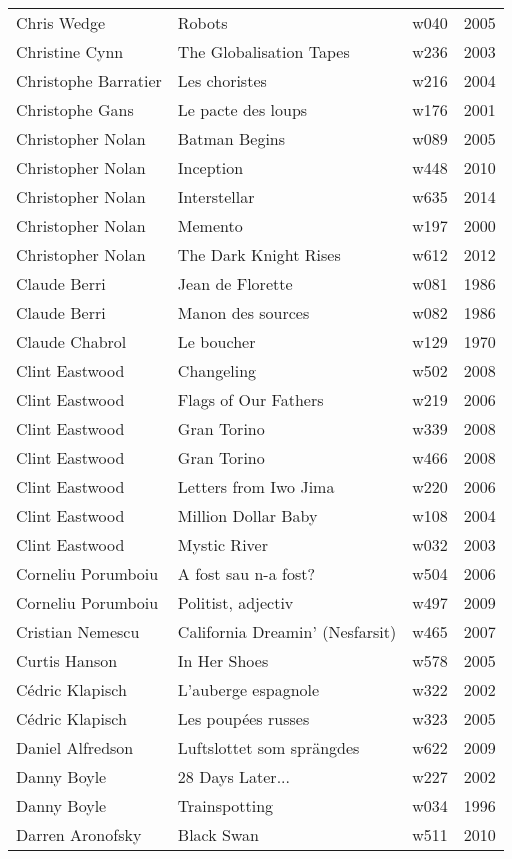 \documentclass{article}
\begin{document}
\begin {center}
\begin{longtable}{l p{10cm} l l}
Chris Wedge & Robots & w040 & 2005 \\
Christine Cynn & The Globalisation Tapes & w236 & 2003 \\
Christophe Barratier & Les choristes & w216 & 2004 \\
Christophe Gans & Le pacte des loups & w176 & 2001 \\
Christopher Nolan & Batman Begins & w089 & 2005 \\
Christopher Nolan & Inception & w448 & 2010 \\
Christopher Nolan & Interstellar & w635 & 2014 \\
Christopher Nolan & Memento & w197 & 2000 \\
Christopher Nolan & The Dark Knight Rises & w612 & 2012 \\
Claude Berri & Jean de Florette & w081 & 1986 \\
Claude Berri & Manon des sources & w082 & 1986 \\
Claude Chabrol & Le boucher & w129 & 1970 \\
Clint Eastwood & Changeling & w502 & 2008 \\
Clint Eastwood & Flags of Our Fathers & w219 & 2006 \\
Clint Eastwood & Gran Torino & w339 & 2008 \\
Clint Eastwood & Gran Torino & w466 & 2008 \\
Clint Eastwood & Letters from Iwo Jima & w220 & 2006 \\
Clint Eastwood & Million Dollar Baby & w108 & 2004 \\
Clint Eastwood & Mystic River & w032 & 2003 \\
Corneliu Porumboiu & A fost sau n-a fost? & w504 & 2006 \\
Corneliu Porumboiu & Politist, adjectiv & w497 & 2009 \\
Cristian Nemescu & California Dreamin' (Nesfarsit) & w465 & 2007 \\
Curtis Hanson & In Her Shoes & w578 & 2005 \\
Cédric Klapisch & L'auberge espagnole & w322 & 2002 \\
Cédric Klapisch & Les poupées russes & w323 & 2005 \\
Daniel Alfredson & Luftslottet som sprängdes & w622 & 2009 \\
Danny Boyle & 28 Days Later... & w227 & 2002 \\
Danny Boyle & Trainspotting & w034 & 1996 \\
Darren Aronofsky & Black Swan & w511 & 2010 \\

\end{longtable}
\end{center}
\end{document}
